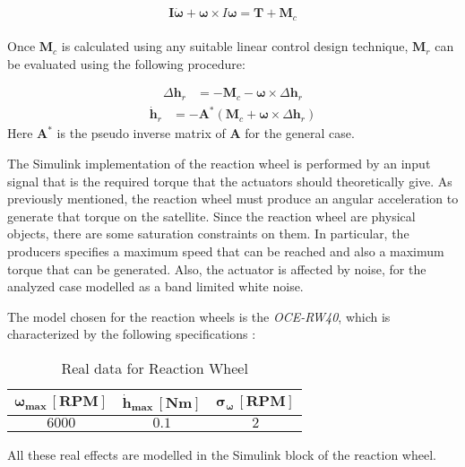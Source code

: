 	\begin{equation*}
		\boldsymbol{I} \dot{\boldsymbol{\omega}} + \boldsymbol{\omega} \times I \boldsymbol{\omega} = \mathbf{T} + \mathbf{M}_c
	\end{equation*}\\
Once \( \mathbf{M}_c \) is calculated using any suitable linear control design technique,  \( \mathbf{M}_r \) can be evaluated using the following procedure:
	
	\begin{align*}
		\Delta \mathbf{h}_r &= -\mathbf{M}_c - \boldsymbol{\omega} \times \Delta \mathbf{h}_r 
	\end{align*}
	\begin{align*}
	\dot{\mathbf{h}}_r &= -\mathbf{A}^* ( \mathbf{M}_c + \boldsymbol{\omega} \times \Delta \mathbf{h}_r )
    \end{align*}
Here \( \mathbf{A}^* \) is the pseudo inverse matrix of \( \mathbf{A} \) for the general case.

The Simulink implementation of the reaction wheel is performed by an input signal that is the required torque that the actuators should theoretically give. As previously mentioned, the reaction wheel must produce an angular acceleration to generate that torque on the satellite. Since the reaction wheel are physical objects, there are some saturation constraints on them. In particular, the producers specifies a maximum speed that can be reached and also a maximum torque that can be generated. Also, the actuator is affected by noise, for the analyzed case modelled as a band limited white noise. 

The model chosen for the reaction wheels is the \textit{OCE-RW40}, which is characterized by the following specifications \cite{reactionwheel_site}:

\begin{table}[H]

    \centering
    \begin{tabular}{|c|c|c|}
    \hline
    $\bm{\omega_{max} \, [RPM]}$ & $\bm{\dot{h}_{max} \, [Nm]}$ & $\bm{\sigma_{\omega} \, [RPM]}$ \\
    \hline
    $6000$ & $0.1$ & $2$  \\
    \hline
    \end{tabular}
    
    \caption{Real data for Reaction Wheel}
    \label{table:RW}
    
\end{table}

All these real effects are modelled in the Simulink block of the reaction wheel. 
	
